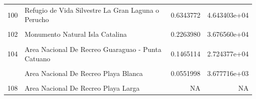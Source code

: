 \documentclass[10pt,landscape,a3paper]{article}
\begin{document}
\begin{longtable}[t]{llrr}
100 & Refugio de Vida Silvestre La Gran Laguna o Perucho & 0.6343772 & 4.643403e+04\\
\addlinespace
\cellcolor{lightgray}{101} & \cellcolor{lightgray}{Area Nacional De Recreo Boca de Nigua} & \cellcolor{lightgray}{0.6713110} & \cellcolor{lightgray}{3.903465e+04}\\
102 & Monumento Natural Isla Catalina & 0.2263980 & 3.676560e+04\\
\cellcolor{lightgray}{103} & \cellcolor{lightgray}{Area Nacional De Recreo Playa de Cabo Rojo - Pedernales} & \cellcolor{lightgray}{0.1847187} & \cellcolor{lightgray}{3.235779e+04}\\
104 & Area Nacional De Recreo Guaraguao - Punta Catuano & 0.1465114 & 2.724377e+04\\
\cellcolor{lightgray}{105} & \cellcolor{lightgray}{Refugio de Vida Silvestre Lagunas de Bávaro y El Caletón} & \cellcolor{lightgray}{0.1494940} & \cellcolor{lightgray}{9.567537e+03}\\
\addlinespace
106 & Area Nacional De Recreo Playa Blanca & 0.0551998 & 3.677716e+03\\
\cellcolor{lightgray}{107} & \cellcolor{lightgray}{Area Nacional De Recreo Bahía de las Águilas} & \cellcolor{lightgray}{NA} & \cellcolor{lightgray}{NA}\\
108 & Area Nacional De Recreo Playa Larga & NA & NA\\*
\end{longtable}
\end{document}
